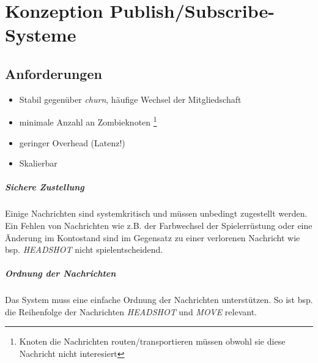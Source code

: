 \chapter{Konzeption Publish/Subscribe-Systeme}
\label{chap:konzeption_pubsub}

\section{Anforderungen}
\begin{itemize}
\item Stabil gegenüber \emph{churn}, häufige Wechsel der Mitgliedschaft
\item minimale Anzahl an Zombieknoten \footnote{Knoten die Nachrichten routen/transportieren müssen obwohl sie diese Nachricht nicht interesiert}
\item geringer Overhead (Latenz!)
\item Skalierbar
\end{itemize}




\paragraph{Sichere Zustellung} Einige Nachrichten sind systemkritisch und müssen unbedingt zugestellt werden. Ein Fehlen von Nachrichten wie z.B. der Farbwechsel der Spielerrüstung oder eine Änderung im Kontostand sind im Gegensatz zu einer verlorenen Nachricht wie bsp. \emph{HEADSHOT} nicht spielentscheidend. 

\paragraph{Ordnung der Nachrichten} Das System muss eine einfache Ordnung der Nachrichten unterstützen. So ist bsp. die Reihenfolge der Nachrichten \emph{HEADSHOT} und \emph{MOVE} relevant.


\cite{BeFiMu2006PubSubQoS}

\cite{PiEyKoSh2007-PubSubAPI}

\cite{KostasKatrinis2005}
